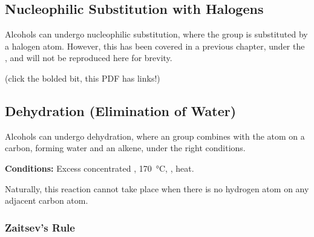 



		\subsection{Nucleophilic Substitution with Halogens}

			Alcohols can undergo nucleophilic substitution, where the  group is substituted by a halogen atom. However, this
			has been covered in a previous chapter, under the \hyperlink{NSubAlcohols}{}, and will not
			be reproduced here for brevity.

			(click the bolded bit, this PDF has links!)



		\pagebreak
		\hypertarget{AlcoholDehydration}{}
		\subsection{Dehydration (Elimination of Water)}

			Alcohols can undergo dehydration, where an  group combines with the  atom on a  carbon, forming
			water and an alkene, under the right conditions.

			\vspace{1.5em}
			\vbox{\textbf{Conditions:}	\tabto{35mm}Excess concentrated , \SI{170}{\celsius}, 
										\tabto{35mm}, heat.}


			Naturally, this reaction cannot take place when there is no hydrogen atom on any adjacent carbon atom.

			\subsubsection{Zaitsev's Rule}


